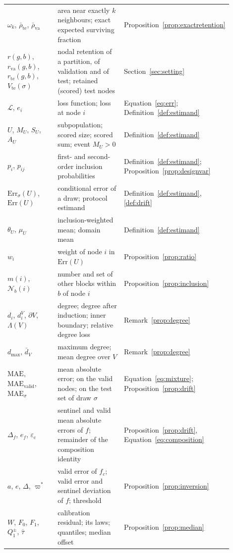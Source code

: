 \begin{tabular}{>{\raggedright\arraybackslash}p{0.30\linewidth}>{\raggedright\arraybackslash}p{0.38\linewidth}>{\raggedright\arraybackslash}p{0.22\linewidth}}
$\omega_k$, $\bar\rho_{\mathrm{te}}$, $\bar\rho_{\mathrm{va}}$ & area near exactly $k$ neighbours; exact expected surviving fraction & Proposition~\ref{prop:exactretention} \\
$r(g,b)$, $r_{\mathrm{va}}(g,b)$, $r_{\mathrm{te}}(g,b)$, $V_{\mathrm{te}}(\sigma)$ & nodal retention of a partition, of validation and of test; retained (scored) test nodes & Section~\ref{sec:setting} \\
$\mathcal{L}$, $e_i$ & loss function; loss at node $i$ & Equation~\eqref{eq:err}; Definition~\ref{def:estimand} \\
$U$, $M_U$, $S_U$, $A_U$ & subpopulation; scored size; scored sum; event $M_U > 0$ & Definition~\ref{def:estimand} \\
$p_i$, $p_{ij}$ & first- and second-order inclusion probabilities & Definition~\ref{def:estimand}; Proposition~\ref{prop:designvar} \\
$\mathrm{Err}_\sigma(U)$, $\mathrm{Err}(U)$ & conditional error of a draw; protocol estimand & Definition~\ref{def:estimand}, \ref{def:drift} \\
$\theta_U$, $\mu_U$ & inclusion-weighted mean; domain mean & Definition~\ref{def:estimand} \\
$w_i$ & weight of node $i$ in $\mathrm{Err}(U)$ & Proposition~\ref{prop:ratio} \\
$m(i)$, $\mathcal{N}_b(i)$ & number and set of other blocks within $b$ of node $i$ & Proposition~\ref{prop:inclusion} \\
$d_i$, $d_i^V$, $\partial V$, $\Lambda(V)$ & degree; degree after induction; inner boundary; relative degree loss & Remark~\ref{prop:degree} \\
$d_{\max}$, $\bar d_V$ & maximum degree; mean degree over $V$ & Remark~\ref{prop:degree} \\
$\mathrm{MAE}$, $\mathrm{MAE}_{\mathrm{valid}}$, $\mathrm{MAE}_{\sigma}$ & mean absolute error; on the valid nodes; on the test set of draw $\sigma$ & Equation~\eqref{eq:mixture}; Proposition~\ref{prop:drift} \\
$\Delta_f$, $e_f$, $\varepsilon_{\mathrm{c}}$ & sentinel and valid mean absolute errors of $f$; remainder of the composition identity & Proposition~\ref{prop:drift}, Equation~\eqref{eq:composition} \\
$a$, $e$, $\Delta$, $\varpi^*$ & valid error of $f_c$; valid error and sentinel deviation of $f$; threshold & Proposition~\ref{prop:inversion} \\
$W$, $F_0$, $F_1$, $Q_1^{\pm}$, $\hat\tau$ & calibration residual; its laws; quantiles; median offset & Proposition~\ref{prop:median} \\
\bottomrule
\end{tabular}
